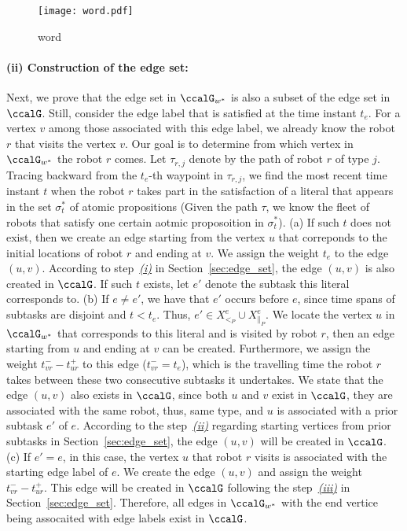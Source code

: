 \documentclass[Afour,sageh,times]{sagej}
\begin{document}
{{{\begin{figure}[!t]
  \centering
  \texttt{[image: word.pdf]}
  \caption{word}
  \label{fig:word}
\end{figure}

\paragraph{(ii) Construction of the edge set:} Next, we prove that the edge set in $\ccalG_{w^*}$ is also a subset of the edge set in $\ccalG$. Still, consider the edge label that is satisfied at the time instant $t_e$. For a vertex $v$ among those associated with this edge label, we already know the robot $r$ that visits the vertex $v$. Our goal is to determine from which vertex in $\ccalG_{w^*}$ the robot $r$ comes. Let $\tau_{r,j}$ denote by the path of robot $r$ of type $j$. Tracing backward from the $t_e$-th waypoint in $\tau_{r,j}$, we find the most recent time instant $t$  when the robot $r$ takes part in the satisfaction of a literal that appears in the set $\sigma^*_{t}$ of atomic propositions (Given the path $\tau$, we know the fleet of robots that satisfy one certain aotmic proposoition in $\sigma^*_t$). (a) If such $t$ does not exist, then we create an edge starting from the vertex $u$ that correponds to the initial locations of robot $r$ and ending at $v$. We assign the weight $t_e$ to the edge $(u,v)$. According to step~\hyperref[sec:a]{\it (i)} in Section~\ref{sec:edge_set}, the edge $(u,v)$ is  also  created in $\ccalG$. If such $t$ exists, let $e'$ denote the subtask this literal corresponds to. (b) If $e\neq e'$, we have that $e'$ occurs before $e$, since time spans of subtasks are disjoint and $t < t_e$. Thus, $e' \in X_{<_P}^{e} \cup X_{\|_P}^e$. We locate the vertex $u$ in $\ccalG_{w^*}$ that corresponds to this literal and is visited by robot $r$, then an edge starting from $u$ and ending at $v$ can be created. Furthermore, we assign the weight $t_{vr}^- - t_{ur}^+$ to this edge ($t_{vr}^-=t_e$), which is the travelling time the robot $r$ takes between these two consecutive subtasks it undertakes. We state that the edge $(u, v)$ also exists in $\ccalG$, since both $u$ and $v$ exist in $\ccalG$, they are associated with the same robot, thus, same type, and $u$ is associated with a prior subtask $e'$ of $e$. According to the step~\hyperref[sec:b]{\it (ii)} regarding starting vertices from prior subtasks in Section~\ref{sec:edge_set}, the edge $(u,v)$ will be created in $\ccalG$. (c) If $e'=e$, in this case, the vertex $u$ that robot $r$ visits is associated with the starting edge label of $e$. We create the edge $(u,v)$ and assign the weight $t_{vr}^- - t_{ur}^+$. This edge will be created in $\ccalG$ following the step~\hyperref[sec:c]{\it (iii)} in Section~\ref{sec:edge_set}. Therefore, all edges in $\ccalG_{w^*}$ with the end vertice being assocaited with edge labels exist in $\ccalG$.

}}}
\end{document}
